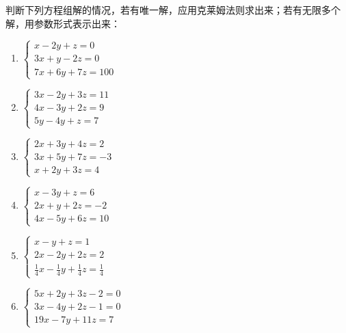 \begin{ex}
    判断下列方程组解的情况，若有唯一解，应用克莱姆法则求出来；若有无限多个解，用参数形式表示出来：
    \begin{multicols}{2}
\begin{enumerate}
    \item $\begin{cases}
         x-2 y+ z=0\\ 
        3 x+ y-2 z=0 \\ 
        7x+6 y+7z=100
    \end{cases}$
    \item $\begin{cases}
        3 x-2 y+3 z=11 \\ 
        4 x-3 y+2 z=9 \\ 
        5 y-4 y+z=7
    \end{cases}$
\item $\begin{cases} 2 x+3 y+4 z =2 \\ 3 x+5 y+7 z =-3 \\ x+2 y+3 z =4 \end{cases}$
\item $\begin{cases}x-3 y+z=6 \\ 2 x+y+2 z=-2 \\ 4 x-5 y+6 z=10\end{cases}$
\item $\begin{cases}x-y+z=1 \\ 2 x-2 y+2 z=2 \\ \frac{1}{4} x-\frac{1}{4} y+\frac{1}{4}z=\frac{1}{4}\end{cases}$
\item $\begin{cases}5 x+2 y+3 z-2=0 \\ 3 x-4 y+2 z-1=0 \\ 19 x-7 y+11 z=7\end{cases}$
\end{enumerate}        
    \end{multicols}
\end{ex}

